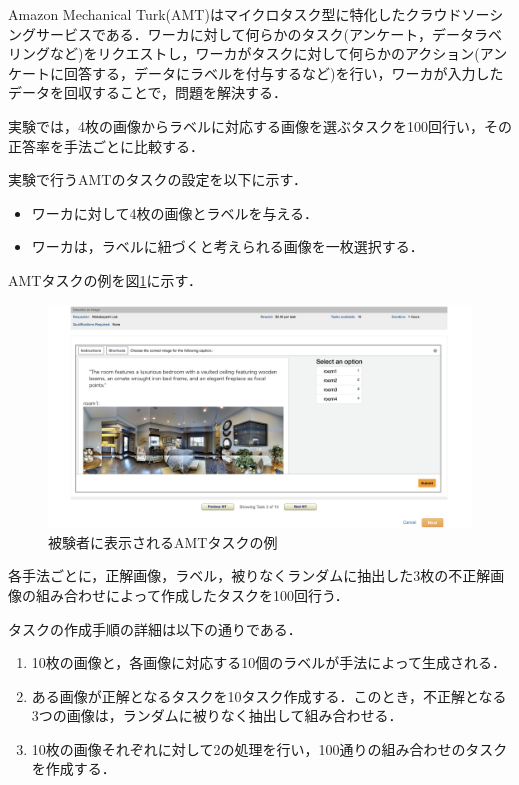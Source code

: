 \documentclass[a4paper,11pt]{jreport}
\begin{document}
Amazon Mechanical Turk(AMT)はマイクロタスク型に特化したクラウドソーシングサービスである．ワーカに対して何らかのタスク(アンケート，データラベリングなど)をリクエストし，ワーカがタスクに対して何らかのアクション(アンケートに回答する，データにラベルを付与するなど)を行い，ワーカが入力したデータを回収することで，問題を解決する．

実験では，4枚の画像からラベルに対応する画像を選ぶタスクを100回行い，その正答率を手法ごとに比較する．

実験で行うAMTのタスクの設定を以下に示す．

\begin{itemize}
  \item ワーカに対して4枚の画像とラベルを与える．
  \item ワーカは，ラベルに紐づくと考えられる画像を一枚選択する．
\end{itemize}

AMTタスクの例を図\ref{fig:amt_example}に示す．

\begin{figure}[H]
  \centering
  \includegraphics[width=\linewidth]{figures/amt.png}
  \caption{被験者に表示されるAMTタスクの例}
  \label{fig:amt_example}
\end{figure}

各手法ごとに，正解画像，ラベル，被りなくランダムに抽出した3枚の不正解画像の組み合わせによって作成したタスクを100回行う．

タスクの作成手順の詳細は以下の通りである．
\begin{enumerate}
  \item 10枚の画像と，各画像に対応する10個のラベルが手法によって生成される．
  \item ある画像が正解となるタスクを10タスク作成する．このとき，不正解となる3つの画像は，ランダムに被りなく抽出して組み合わせる．
  \item 10枚の画像それぞれに対して2の処理を行い，100通りの組み合わせのタスクを作成する．
\end{enumerate}
\end{document}
